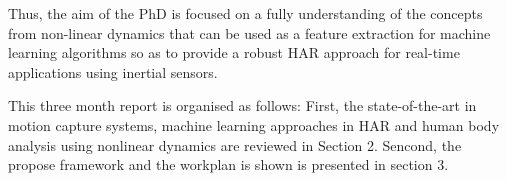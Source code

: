 Thus, the aim of the PhD is focused on a fully understanding 
of the concepts from non-linear dynamics that can be used 
as a feature extraction for machine learning algorithms so as to provide 
a robust HAR approach for real-time applications using inertial sensors.
% 
%   


This three month report is organised as follows: First,
the state-of-the-art in motion capture systems, machine learning approaches in HAR
and human body analysis using nonlinear dynamics are reviewed in Section 2. Sencond, 
the propose framework and the workplan is shown is presented in section 3.



